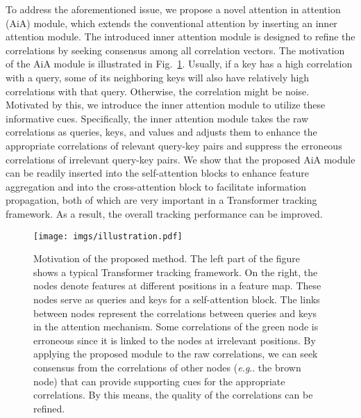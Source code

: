 \documentclass[runningheads]{llncs}
\makeatletter
\DeclareRobustCommand\onedot{\futurelet\@let@token\@onedot}
\def\@onedot{\ifx\@let@token.\else.\null\fi\xspace}
\def\eg{\emph{e.g}\onedot} \def\Eg{\emph{E.g}\onedot}
\makeatother
\begin{document}
To address the aforementioned issue, we propose a novel attention in attention (AiA) module, which extends the conventional attention \cite{vaswani2017attention} by inserting an inner attention module. The introduced inner attention module is designed to refine the correlations by seeking consensus among all correlation vectors. The motivation of the AiA module is illustrated in Fig.~\ref{figure-illustration}. Usually, if a key has a high correlation with a query, some of its neighboring keys will also have relatively high correlations with that query. Otherwise, the correlation might be noise. Motivated by this, we introduce the inner attention module to utilize these informative cues. Specifically, the inner attention module takes the raw correlations as queries, keys, and values and adjusts them to enhance the appropriate correlations of relevant query-key pairs and suppress the erroneous correlations of irrelevant query-key pairs. We show that the proposed AiA module can be readily inserted into the self-attention blocks to enhance feature aggregation and into the cross-attention block to facilitate information propagation, both of which are very important in a Transformer tracking framework. As a result, the overall tracking performance can be improved.


\begin{figure}[t]
\centering
\texttt{[image: imgs/illustration.pdf]}
\caption{Motivation of the proposed method. The left part of the figure shows a typical Transformer tracking framework. On the right, the nodes denote features at different positions in a feature map. These nodes serve as queries and keys for a self-attention block. The links between nodes represent the correlations between queries and keys in the attention mechanism. Some correlations of the \textcolor{node1}{green} node is \textcolor{link1}{erroneous} since it is linked to the nodes at irrelevant positions. By applying the proposed module to the raw correlations, we can seek consensus from the correlations of other nodes (\eg the \textcolor{node2}{brown} node) that can provide supporting cues for the \textcolor{link2}{appropriate} correlations. By this means, the quality of the correlations can be refined.}
\label{figure-illustration}
\end{figure}
\end{document}
